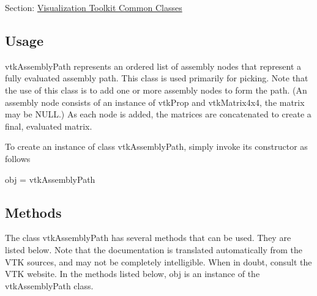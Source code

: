 Section\-: \hyperlink{sec_vtkcommon}{Visualization Toolkit Common Classes} \hypertarget{vtkwidgets_vtkxyplotwidget_Usage}{}\subsection{Usage}\label{vtkwidgets_vtkxyplotwidget_Usage}
vtk\-Assembly\-Path represents an ordered list of assembly nodes that represent a fully evaluated assembly path. This class is used primarily for picking. Note that the use of this class is to add one or more assembly nodes to form the path. (An assembly node consists of an instance of vtk\-Prop and vtk\-Matrix4x4, the matrix may be N\-U\-L\-L.) As each node is added, the matrices are concatenated to create a final, evaluated matrix.

To create an instance of class vtk\-Assembly\-Path, simply invoke its constructor as follows \begin{DoxyVerb}  obj = vtkAssemblyPath
\end{DoxyVerb}
 \hypertarget{vtkwidgets_vtkxyplotwidget_Methods}{}\subsection{Methods}\label{vtkwidgets_vtkxyplotwidget_Methods}
The class vtk\-Assembly\-Path has several methods that can be used. They are listed below. Note that the documentation is translated automatically from the V\-T\-K sources, and may not be completely intelligible. When in doubt, consult the V\-T\-K website. In the methods listed below, {\ttfamily obj} is an instance of the vtk\-Assembly\-Path class. 

